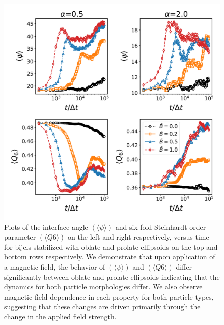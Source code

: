 \begin{figure} 
\centering 
\includegraphics[scale=0.3]{../figures/results/paper2/interface_angle-nint-field_on.png} 
\caption{Plots of the interface angle $(\langle \psi \rangle)$ and six fold Steinhardt order parameter 
         $(\langle Q6 \rangle)$ on the left and right respectively, versus time for bijels stabilized with 
         oblate and prolate ellipsoids on the top and bottom rows respectively. We demonstrate that upon application 
         of a magnetic field, the behavior of $(\langle \psi \rangle)$ and $(\langle Q6 \rangle)$ differ significantly 
         between oblate and prolate ellipsoids indicating that the dynamics for both particle morphologies differ. We also observe magnetic field dependence in each property for both particle types, suggesting that these changes are driven primarily through the change in the applied field strength.} 
\label{fig:interface_angle-nint-field_on} 
\end{figure}


